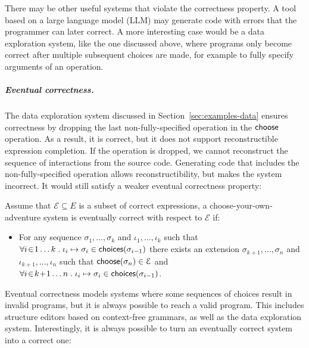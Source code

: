 \documentclass[anonymous, a4paper,UKenglish,cleveref, autoref, thm-restate]{lipics-v2021}
\newcommand{\ident}[1]{\textsf{#1}}
\newcommand{\select}{\textnormal{\ident{choose}}}
\newcommand{\choices}{\textnormal{\ident{choices}}}
\begin{document}
There may be other useful systems that violate the correctness property. A tool based on a large
language model (LLM) may generate code with errors that the programmer can later
correct. A more interesting case would be a data exploration system, like the one discussed above,
where programs only become correct after multiple subsequent choices are made, for example
to fully specify arguments of an operation.

\subparagraph{Eventual correctness.}
The data exploration system discussed in Section~\ref{sec:examples-data} ensures correctness
by dropping the last non-fully-specified operation in the $\select$ operation. As a result, it is
correct, but it does not support reconstructible expression completion. If the operation is dropped,
we cannot reconstruct the sequence of interactions from the source code. Generating code
that includes the non-fully-specified operation allows reconstructibility, but makes the system
incorrect. It would still satisfy a weaker eventual correctness property:

\begin{definition}\label{def:eventual}
Assume that $\mathcal{E}\subseteq E$ is a subset of correct expressions,
a choose-your-own-adventure system is eventually correct with respect to $\mathcal{E}$ if:
\begin{itemize}
\item For any sequence $\sigma_1,\ldots,\sigma_k$ and $\iota_1,\ldots,\iota_k$ such that
  $\forall i\!\in\! 1\ldots k\;.\; \iota_i\mapsto\sigma_i \in \choices(\sigma_{i-1})$
  there exists an extension $\sigma_{k+1},\ldots,\sigma_n$ and $\iota_{k+1},\ldots,\iota_n$ such that
  $\select(\sigma_n) \in \mathcal{E}$ and
  $\forall i\!\in\! k\!+\!1\ldots n\;.\;\iota_i\mapsto\sigma_i \in \choices(\sigma_{i-1})$.
\end{itemize}
\end{definition}

Eventual correctness models systems where some sequences of choices result in invalid programs,
but it is always possible to reach a valid program. This includes
structure editors based on context-free grammars, as well as the data exploration system.
Interestingly, it is always possible to turn an eventually correct system into a correct one:
\end{document}
